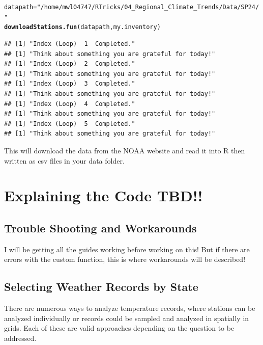 \documentclass{article}\usepackage[]{graphicx}\usepackage[]{xcolor}
\makeatletter
\newcommand{\hlstr}[1]{\textcolor[rgb]{0.192,0.494,0.8}{#1}}%
\newcommand{\hlstd}[1]{\textcolor[rgb]{0.345,0.345,0.345}{#1}}%
\newcommand{\hlkwb}[1]{\textcolor[rgb]{0.69,0.353,0.396}{#1}}%
\newcommand{\hlkwd}[1]{\textcolor[rgb]{0.737,0.353,0.396}{\textbf{#1}}}%
\newenvironment{kframe}{%
 \def\at@end@of@kframe{}%
 \ifinner\ifhmode%
  \def\at@end@of@kframe{\end{minipage}}%
  \begin{minipage}{\columnwidth}%
 \fi\fi%
 \def\FrameCommand##1{\hskip\@totalleftmargin \hskip-\fboxsep
 \colorbox{shadecolor}{##1}\hskip-\fboxsep
     \hskip-\linewidth \hskip-\@totalleftmargin \hskip\columnwidth}%
 \MakeFramed {\advance\hsize-\width
   \@totalleftmargin\z@ \linewidth\hsize
   \@setminipage}}%
 {\par\unskip\endMakeFramed%
 \at@end@of@kframe}
\newenvironment{knitrout}{}{} %
\makeatother
\begin{document}
\begin{description}
\begin{knitrout}
\color{fgcolor}\begin{kframe}
\begin{alltt}
\hlstd{datapath} \hlkwb{=} \hlstr{"/home/mwl04747/RTricks/04_Regional_Climate_Trends/Data/SP24/"}
\hlkwd{downloadStations.fun}\hlstd{(datapath, my.inventory)}
\end{alltt}
\begin{verbatim}
## [1] "Index (Loop)  1  Completed."
## [1] "Think about something you are grateful for today!"
## [1] "Index (Loop)  2  Completed."
## [1] "Think about something you are grateful for today!"
## [1] "Index (Loop)  3  Completed."
## [1] "Think about something you are grateful for today!"
## [1] "Index (Loop)  4  Completed."
## [1] "Think about something you are grateful for today!"
## [1] "Index (Loop)  5  Completed."
## [1] "Think about something you are grateful for today!"
\end{verbatim}
\end{kframe}
\end{knitrout}

This will download the data from the NOAA website and read it into R then written as csv files in your data folder.

\end{description}

\section{Explaining the Code TBD!!}

\subsection{Trouble Shooting and Workarounds}

I will be getting all the guides working before working on this! But if there are errors with the custom function, this is where workarounds will be described!

\subsection{Selecting Weather Records by State}

There are numerous ways to analyze temperature records, where stations can be analyzed individually or records could be sampled and analyzed in spatially in grids. Each of these are valid approaches depending on the question to be addressed. 
\end{document}
